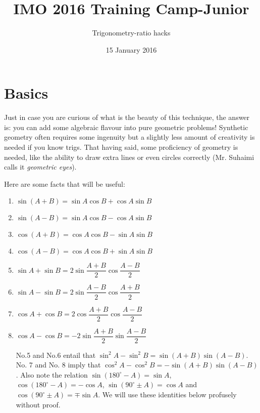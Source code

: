 \documentclass[11pt,a4paper]{article}
\begin{document}
\title{IMO 2016 Training Camp-Junior}
\author{Trigonometry-ratio hacks}
\date{15 January 2016}
\maketitle

\section {Basics}
Just in case you are curious of what is the beauty of this technique, the answer is: you can add some algebraic flavour into pure geometric problems! Synthetic geometry often requires some ingenuity but a slightly less amount of creativity is needed if you know trigs. That having said, some proficiency of geometry is needed, like the ability to draw extra lines or even circles correctly (Mr. Suhaimi calls it \emph {geometric eyes}).

Here are some facts that will be useful:
\begin{enumerate}
\item$\sin (A+B)=\sin A\cos B+\cos A\sin B$
\item$\sin (A-B)=\sin A\cos B-\cos A\sin B$
\item$\cos (A+B)=\cos A\cos B-\sin A\sin B$
\item $\cos (A-B)=\cos A\cos B+\sin A\sin B$
\item $\sin A+\sin B=2\sin \dfrac{A+B}{2} \cos \dfrac{A-B}{2}$
\item $\sin A-\sin B=2\sin \dfrac{A-B}{2} \cos\dfrac{A+B}{2}$
\item $\cos A+\cos B=2\cos \dfrac{A+B}{2} \cos \dfrac{A-B}{2}$
\item $\cos A-\cos B=-2\sin \dfrac{A+B}{2} \sin \dfrac{A-B}{2}$

 No.5 and No.6 entail that $\sin^{2} A-\sin^{2} B=\sin (A+B)\sin (A-B)$. No. 7 and No. 8 imply that $\cos ^{2}A-\cos ^{2}B=-\sin (A+B)\sin (A-B)$. Also note the relation $\sin (180^{\circ}-A)=\sin A$, $\cos (180^{\circ}-A)=-\cos A$, $\sin (90^{\circ}\pm A)=\cos A$ and $\cos (90^{\circ}\pm A)=\mp\sin A$. We will use these identities below profusely without proof.

\end{enumerate}
\end{document}
